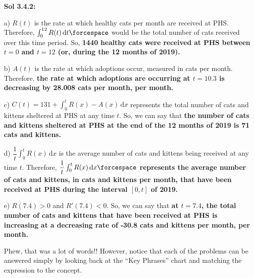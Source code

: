 \begin{tcolorbox}[solution]
    \textbf{Sol 3.4.2: } \par
    a) $R(t)$ is the rate at which healthy cats per month are received at PHS. Therefore, $\int_0^{12} R(t) \,\mathrm{d}t \forcespace$ would be the total number of cats received over this time period. So, \textbf{1440 healthy cats were received at PHS between $t = 0$ and $t = 12$ (or, during the 12 months of 2019).} \par
    \vspace{11pt}
    b) $A(t)$ is the rate at which adoptions occur, measured in cats per month. Therefore, \textbf{the rate at which adoptions are occurring at $t = 10.3$ is decreasing by 28.008 cats per month, per month.} \par
    \vspace{11pt}
    c) $C(t) = 131 + \int_0^t R(x) - A(x) \,\mathrm{d}x$ represents the total number of cats and kittens sheltered at PHS at any time $t$. So, we can say that \textbf{the number of cats and kittens sheltered at PHS at the end of the 12 months of 2019 is 71 cats and kittens.} \par
    \vspace{11pt}
    d) $\dfrac{1}{t}\int_0^t R(x) \,\mathrm{d}x$ is the average number of cats and kittens being received at any time $t$. Therefore, \textbf{$\dfrac{1}{t}\int_0^t R(x) \,\mathrm{d}x \forcespace$ represents the average number of cats and kittens, in cats and kittens per month, that have been received at PHS during the interval $[0, t]$ of 2019.} \par
    \vspace{11pt}
    e) $R(7.4) > 0$ and $R'(7.4) < 0$. So, we can say that \textbf{at $t = 7.4$, the total number of cats and kittens that have been received at PHS is increasing at a decreasing rate of -30.8 cats and kittens per month, per month.} \par
    \vspace{11pt}
    Phew, that was a lot of words!! However, notice that each of the problems can be answered simply by looking back at the ``Key Phrases'' chart and matching the expression to the concept.
\end{tcolorbox} \vspace{11pt}


